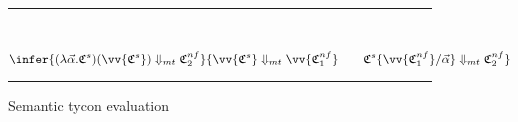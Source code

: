 
\begin{figure}
\centering
\hrule 
\small
\setlength{\tabcolsep}{0ex}
\renewcommand{\arraystretch}{1.1}
~\\[1mm]
\begin{equation}
\infer{(\lambda\vec{\alpha}.\mathfrak{C}^s)(\vv{\mathfrak{C}^s}) \Downarrow_{mt} \mathfrak{C}^{nf}_2}
{\vv{\mathfrak{C}^s}\Downarrow_{mt} \vv{\mathfrak{C}^{nf}_1}\qquad\mathfrak{C}^s\{\vv{\mathfrak{C}^{nf}_1}/\vec{\alpha}\} \Downarrow_{mt} \mathfrak{C}^{nf}_2} 
\end{equation}
\hrule
\caption{Semantic tycon evaluation}
\label{fig:semtyceval}
\end{figure}